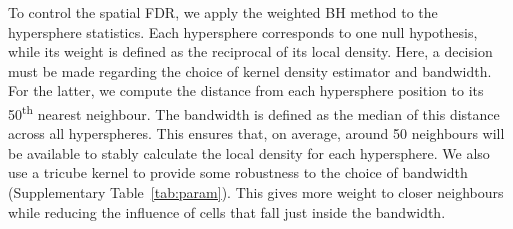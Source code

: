\documentclass{article}
\begin{document}
To control the spatial FDR, we apply the weighted BH method to the hypersphere statistics.
Each hypersphere corresponds to one null hypothesis, while its weight is defined as the reciprocal of its local density.
Here, a decision must be made regarding the choice of kernel density estimator and bandwidth.
For the latter, we compute the distance from each hypersphere position to its 50\textsuperscript{th} nearest neighbour.
The bandwidth is defined as the median of this distance across all hyperspheres.
This ensures that, on average, around 50 neighbours will be available to stably calculate the local density for each hypersphere.
We also use a tricube kernel to provide some robustness to the choice of bandwidth (Supplementary Table~\ref{tab:param}).
This gives more weight to closer neighbours while reducing the influence of cells that fall just inside the bandwidth.
\end{document}
